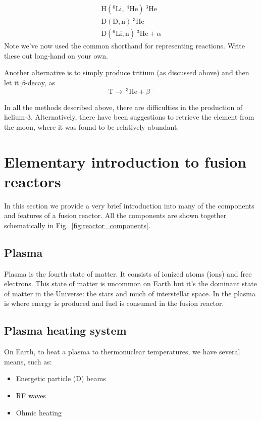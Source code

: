 \documentclass[11pt]{report} %
\begin{document}
\begin{align}
\mathrm{H}(^6\mathrm{Li},~^4\mathrm{He})~^3\mathrm{He}\\
\mathrm{D}(\mathrm{D},\mathrm{n})~^3\mathrm{He}\\
\mathrm{D}(^6\mathrm{Li},\mathrm{n})~^3\mathrm{He}+\alpha
\end{align}
Note we've now used the common shorthand for representing reactions. Write these out long-hand on your own.

Another alternative is to simply produce tritium (as discussed above) and then let it $\beta$-decay, as
\begin{equation}
\mathrm{T} \xrightarrow{}~^3\mathrm{He} + \beta^-
\end{equation}

In all the methods described above, there are difficulties in the production of helium-3. Alternatively, there have been suggestions to retrieve the element from the moon, where it was found to be relatively abundant.

\section{Elementary introduction to fusion reactors}
In this section we provide a very brief introduction into many of the components and features of a fusion reactor. All the components are shown together schematically in Fig.~\ref{fig:reactor_components}.
\subsection{Plasma}
Plasma is the fourth state of matter. It consists of ionized atoms (ions) and free electrons. This state of matter is uncommon on Earth but it's the dominant state of matter in the Universe: the stars and much of interstellar space. In the plasma is where energy is produced and fuel is consumed in the fusion reactor.
\subsection{Plasma heating system}
On Earth, to heat a plasma to thermonuclear temperatures, we have several means, such as:
\begin{itemize}
\item Energetic particle (D) beams
\item RF waves
\item Ohmic heating
\end{itemize}
\end{document}
